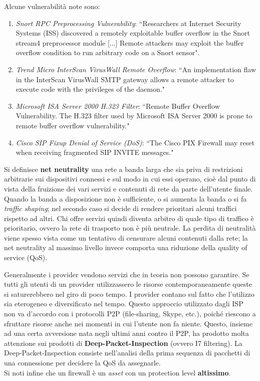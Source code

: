 Alcune vulnerabilità note sono:
\begin{enumerate}
	\item \textit{Snort RPC Preprocessing Vulnerability}: \textquotedblleft Researchers at Internet Security Systems (ISS) discovered a remotely exploitable buffer overflow in the Snort stream4 preprocessor module [...] Remote attackers may exploit the buffer overflow condition to run arbitrary code on a Snort sensor".
	\item \textit{Trend Micro InterScan VirusWall Remote Overflow}: \textquotedblleft An implementation flaw in the InterScan VirusWall SMTP gateway allows a remote attacker to execute code with the privileges of the daemon."
	\item \textit{Microsoft ISA Server 2000 H.323 Filter}: \textquotedblleft Remote Buffer Overflow Vulnerability. The H.323 filter used by Microsoft ISA Server 2000 is prone to remote buffer overflow vulnerability."
	\item \textit{Cisco SIP Fixup Denial of Service (DoS)}: \textquotedblleft The Cisco PIX Firewall may reset when receiving fragmented SIP INVITE messages."
\end{enumerate}

Si definisce \textbf{net neutrality} una rete a banda larga che sia priva di restrizioni arbitrarie sui dispositivi connessi e sul modo in cui essi operano, cioè dal punto di vista della fruizione dei vari servizi e contenuti di rete da parte dell'utente finale. Quando la banda a disposizione non è sufficiente, o si aumenta la banda o si fa \textit{traffic shaping}; nel secondo caso si decide di rendere prioritari alcuni traffici rispetto ad altri. Chi offre servizi quindi diventa arbitro di quale tipo di traffico è prioritario, ovvero la rete di trasporto non è più neutrale. La perdita di neutralità viene spesso vista come un tentativo di censurare alcuni contenuti dalla rete; la net neutrality al massimo livello invece comporta una riduzione della quality of service (QoS).

Generalmente i provider vendono servizi che in teoria non possono garantire. Se tutti gli utenti di un provider utilizzassero le risorse contemporaneamente queste si saturerebbero nel giro di poco tempo. I provider contano sul fatto che l'utilizzo sia eterogeneo e diversificato nel tempo. Questo approccio utilizzato dagli ISP non va d'accordo con i protocolli P2P (file-sharing, Skype, etc.), poiché riescono a sfruttare risorse anche nei momenti in cui l'utente non fa niente. Questo, insieme ad una certa avversione nata negli ultimi anni contro il P2P, ha prodotto molta attenzione sui prodotti di \textbf{Deep-Packet-Inspection} (ovvero I7 filtering). La Deep-Packet-Inspection consiste nell'analisi della prima sequenza di pacchetti di una connessione per decidere la QoS da assegnarle. \\

Si noti infine che un firewall è un \textit{asset} con un protection level \textbf{altissimo}.